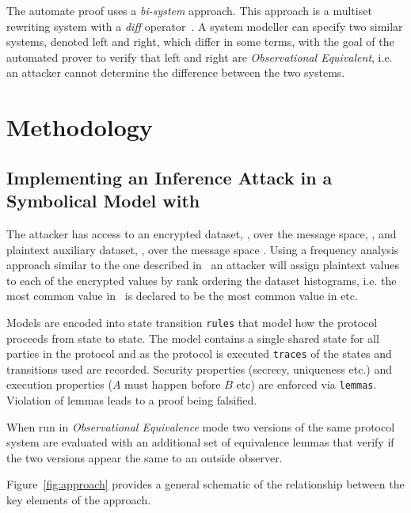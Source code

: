 \documentclass[journal]{IEEEtran}
\begin{document}
The automate proof uses a \textit{bi-system} approach. This approach is a multiset rewriting system with a \textit{diff} operator~\cite{AutomatedObsEqv18}.  A system modeller can specify two similar systems, denoted left and right, which differ in some terms, with the goal of the automated prover to verify that left and right are \textit{Observational Equivalent}, i.e. an attacker cannot determine the difference between the two systems.

\section{Methodology}
\subsection{Implementing an Inference Attack in a Symbolical Model with \tamarin{}}
The attacker has access to an encrypted dataset, \enc{}, over the message space, \encSpace{}, and plaintext auxiliary dataset, \aux{}, over the message space \auxSpace. Using a frequency analysis approach similar to the one described in~\cite{InfrenceAttacks} an attacker will assign plaintext values to each of the encrypted values by rank ordering the dataset histograms, i.e. the most common value in \enc{}\ is declared to be the most common value in \aux{} etc.

Models are encoded into state transition \texttt{rules} that model how the protocol proceeds from state to state. The model contains a single shared state for all parties in the protocol and as the protocol is executed \texttt{traces} of the states and transitions used are recorded. Security properties (secrecy, uniqueness etc.) and execution properties ($A$ must happen before $B$ etc) are enforced via \texttt{lemmas}. Violation of lemmas leads to a proof being falsified.

When run in \textit{Observational Equivalence} mode two versions of the same protocol system are evaluated with an additional set of equivalence lemmas that verify if the two versions appear the same to an outside observer.

Figure~\ref{fig:approach} provides a general schematic of the relationship between the key elements of the approach.
\end{document}
